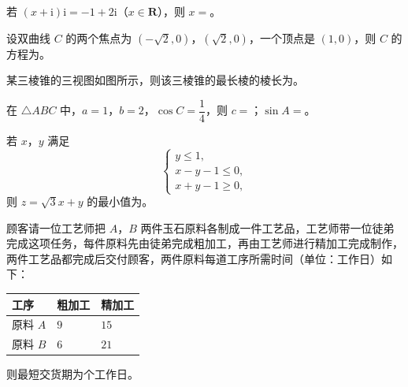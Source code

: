 \begin{question}
若 $(x+\mathrm i)\mathrm i=-1+2\mathrm i$（$x\in\mathbf R$），则 $x=$\gkblank{}。

\end{question}
\begin{question}
设双曲线 $C$ 的两个焦点为 $(-\sqrt2,0)$，$(\sqrt2,0)$，一个顶点是 $(1,0)$，则 $C$ 的方程为\gkblank{}。

\Needspace{0.4\textheight}
\end{question}
\begin{question}
某三棱锥的三视图如图所示，则该三棱锥的最长棱的棱长为\gkblank{}。
\nopagebreak[4]
\begin{center}\end{center}
\nopagebreak[4]
\end{question}
\begin{question}
在 $\triangle ABC$ 中，$a=1$，$b=2$，$\cos C=\dfrac14$，则 $c=$\gkblank{}；$\sin A=$\gkblank{}。

\end{question}
\begin{question}
若 $x$，$y$ 满足
\nopagebreak[4]
\[\begin{cases}
y\leqslant 1,\\
x-y-1\leqslant 0,\\
x+y-1\geqslant 0,
\end{cases}\]
则 $z=\sqrt3x+y$ 的最小值为\gkblank{}。

\end{question}
\begin{question}
顾客请一位工艺师把 $A$，$B$ 两件玉石原料各制成一件工艺品，工艺师带一位徒弟完成这项任务，每件原料先由徒弟完成粗加工，再由工艺师进行精加工完成制作，两件工艺品都完成后交付顾客，两件原料每道工序所需时间（单位：工作日）如下：

\begin{center}
\begin{tabular}{lll}
\toprule
工序 & 粗加工 & 精加工 \\
\midrule
原料 $A$ & $9$ & $15$ \\
原料 $B$ & $6$ & $21$ \\
\bottomrule
\end{tabular}
\end{center}

则最短交货期为\gkblank{}个工作日。

\end{question}

